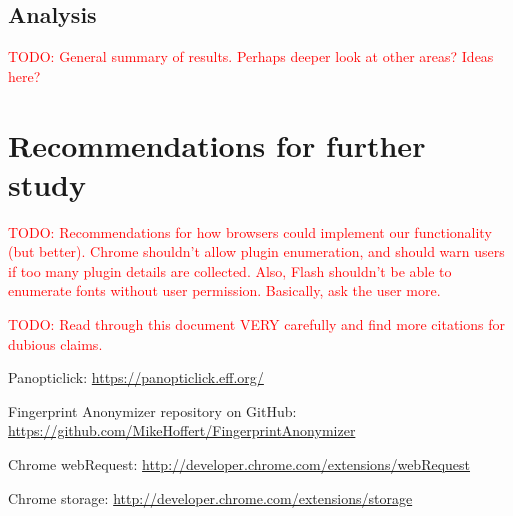 \documentclass[12pt,a4paper]{article}
\begin{document}
\subsection{Analysis}
\textcolor{red}{TODO: General summary of results. Perhaps deeper look at other areas? Ideas here?}

\section{Recommendations for further study}
\textcolor{red}{TODO: Recommendations for how browsers could implement our functionality (but better). Chrome shouldn't allow plugin enumeration, and should warn users if too many plugin details are collected. Also, Flash shouldn't be able to enumerate fonts without user permission. Basically, ask the user more.}


\textcolor{red}{TODO: Read through this document VERY carefully and find more citations for dubious claims.}

\begin{thebibliography}{0}

  Panopticlick: \url{https://panopticlick.eff.org/}

  Fingerprint Anonymizer repository on GitHub: \url{https://github.com/MikeHoffert/FingerprintAnonymizer}

  Chrome webRequest: \url{http://developer.chrome.com/extensions/webRequest}
  
  Chrome storage: \url{http://developer.chrome.com/extensions/storage}

\end{thebibliography}
\end{document}
